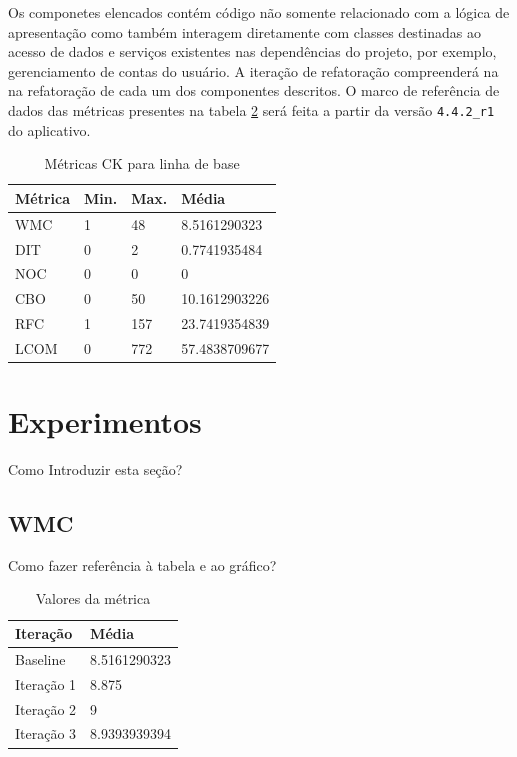 Os componetes elencados contém código não somente relacionado com a lógica de
apresentação como também interagem diretamente com classes destinadas ao acesso
de dados e serviços existentes nas dependências do projeto, por exemplo,
gerenciamento de contas do usuário. A iteração de refatoração compreenderá na
na refatoração de cada um dos componentes descritos. O marco de referência de
dados das métricas presentes na tabela \ref{tab:baseline} será feita a partir da
versão \verb|4.4.2_r1| do aplicativo.

\begin{table}
	\centering
    \begin{tabular}{ | l | l | l | l |}
    \hline
    Métrica & Min. & Max. & Média \\ \hline
    WMC & 1 & 48  	& 8.5161290323   \\ \hline
    DIT	& 0	& 2		&0.7741935484\\ \hline
	NOC & 0	& 0		& 0\\ \hline
	CBO	& 0	& 50	& 10.1612903226\\ \hline
	RFC	& 1	& 157	& 23.7419354839\\ \hline
	LCOM	& 0		& 772	& 57.4838709677\\ \hline
    \end{tabular}
    \caption{Métricas CK para linha de base}
    \label{tab:baseline}
\end{table}


\section{Experimentos}

Como Introduzir esta seção?

\subsection{WMC}

Como fazer referência à tabela e ao gráfico?
\begin{table}[h]
	\centering
    \begin{tabular}{ | l | l | }
    \hline
    Iteração & Média 			\\ \hline
    Baseline & 8.5161290323   	\\ \hline
    Iteração 1 & 8.875			\\ \hline
	Iteração 2 & 9				\\ \hline
	Iteração 3 & 8.9393939394	\\ \hline
    \end{tabular}
    \caption{Valores da métrica}
    \label{tab:baseline}
\end{table}

